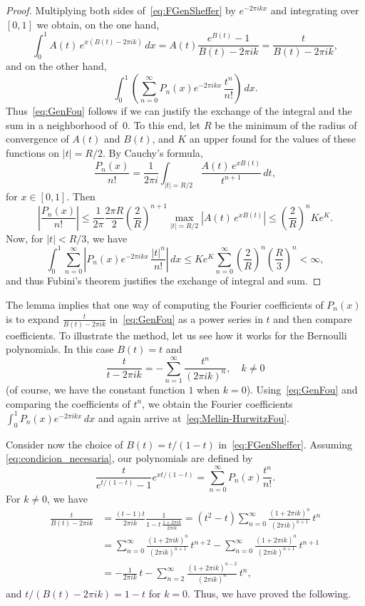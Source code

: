 \documentclass[11pt,a4paper]{amsart}
\theoremstyle{plain}
\theoremstyle{plain}
\theoremstyle{plain}
\theoremstyle{remark}
\begin{document}
\begin{proof}
Multiplying both sides of~\eqref{eq:FGenSheffer} by $e^{-2 \pi i k x}$ and integrating over $[0,1]$ we obtain, on the one hand,
\[
	\int_0^1 A(t)\,e^{x(B(t)-2 \pi i k)}\,dx
= A(t)\frac{e^{B(t)}-1}{B(t)-2 \pi i k} = \frac{t}{B(t)-2 \pi i k},
\]
and on the other hand,
\[
	\int_0^1 \left(\sum_{n=0}^\infty  P_n(x)e^{-2 \pi i k x} \,\frac{t^n}{n!}\right)\,dx.
\]
Thus~\eqref{eq:GenFou} follows if we can justify the exchange of the integral and the sum in a neighborhood of~$0$. To this end, let $R$ be the minimum of the radius of convergence of $A(t)$ and $B(t)$, and $K$ an upper found for the values of these functions on $|t|=R/2$. By Cauchy's formula,
\[
	\frac{P_n(x)}{n!} = \frac{1}{2\pi i} \int_{|t|=R/2} \frac{A(t)\,e^{xB(t)}}{t^{n+1}}\,dt,
\]
for $x\in [0,1]$. Then
\[
	\left|\frac{P_n(x)}{n!}\right|
	\leq \frac{1}{2\pi} \frac{2\pi R}{2} \left(\frac{2}{R}\right)^{n+1} \max_{|t|=R/2} |A(t)\,e^{xB(t)}|
	\leq \left(\frac{2}{R}\right)^n Ke^{K}.
\]
Now, for $|t|<R/3$, we have
\[
	\int_0^1 \sum_{n=0}^\infty  \left|P_n(x)e^{-2 \pi i k x}\, \frac{|t|^n}{n!}\right|\,dx
	\leq Ke^{K} \sum_{n=0}^\infty \left(\frac{2}{R}\right)^n \left(\frac{R}{3}\right)^n < \infty,
\]
and thus Fubini's theorem justifies the exchange of integral and sum.
\end{proof}

The lemma implies that one way of computing the Fourier coefficients of $P_n(x)$ is to expand $\frac{t}{B(t)-2 \pi i k}$ in~\eqref{eq:GenFou} as a power series in $t$ and then compare coefficients. To illustrate the method, let us see how it works for the Bernoulli polynomials. In this case $B(t)=t$ and
$$
	\frac{t}{t-2 \pi i k} = -\sum_{n=1}^\infty \frac{t^n}{(2 \pi i k)^n}, \quad k \ne 0
$$
(of course, we have the constant function $1$ when $k=0$). Using~\eqref{eq:GenFou} and comparing the coefficients of $t^n$, we obtain the Fourier coefficients $\int_0^1 P_n(x)e^{-2 \pi i k x}\,dx$ and again arrive at~\eqref{eq:Mellin-HurwitzFou}.


Consider now the choice of $B(t) = {t}/({1-t})$ in~\eqref{eq:FGenSheffer}. Assuming~ \eqref{eq:condicion_necesaria}, our polynomials are defined by
\begin{equation}
\label{eq:polnuevos}
   \frac{t}{e^{t/(1-t)}-1}e^{xt/(1-t)} = \sum_{n=0}^\infty P_n(x)\frac{t^n}{n!}.
\end{equation}
For $k\ne 0$, we have
\begin{align*}
\frac{t}{B(t)-2 \pi i k}
&= \frac{(t-1)t}{2 \pi i k} \frac{1}{1-t\,\frac{1+2 \pi i k}{2 \pi i k}}
= (t^2-t )\sum_{n=0}^\infty \frac{(1+2 \pi i k)^n}{(2 \pi i k)^{n+1}} \, t^n
\\
&= \sum_{n=0}^\infty \frac{(1+2 \pi i k)^n}{(2 \pi i k)^{n+1}} \, t^{n+2}
- \sum_{n=0}^\infty \frac{(1+2 \pi i k)^n}{(2 \pi i k)^{n+1}} \, t^{n+1}
\\
&= -\frac{1}{2 \pi i k}\,t - \sum_{n=2}^\infty \frac{(1+2 \pi i k)^{n-2}}{(2 \pi i k)^{n}}\,t^n,
\end{align*}
and ${t}/(B(t)-2 \pi i k) = 1-t$ for $k=0$. Thus, we have proved the following.
\end{document}
